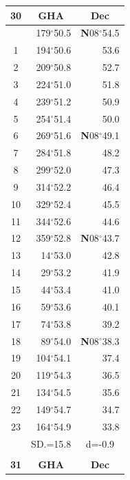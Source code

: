 \documentclass[10pt, a4paper]{report}
\begin{document}
\begin{scriptsize}
\noindent
\begin{tabular*}{0.2\textwidth}[t]{@{\extracolsep{\fill}}|c|rr|}
\hline
\multicolumn{1}{|c|}{\rule{0pt}{2.6ex}\textbf{30}} & \multicolumn{1}{c}{\textbf{GHA}} & \multicolumn{1}{c|}{\textbf{Dec}}\\
\hline\rule{0pt}{2.6ex}\noindent
0 & 179$^\circ$50.5 & \textbf{N}08$^\circ$54.5\\
1 & 194$^\circ$50.6 & 53.6\\
2 & 209$^\circ$50.8 & 52.7\\
3 & 224$^\circ$51.0 & \raisebox{0.24ex}{\boldmath$\cdot$~\boldmath$\cdot$~~}51.8\\
4 & 239$^\circ$51.2 & 50.9\\
5 & 254$^\circ$51.4 & 50.0\\[2Pt]
6 & 269$^\circ$51.6 & \textbf{N}08$^\circ$49.1\\
7 & 284$^\circ$51.8 & 48.2\\
8 & 299$^\circ$52.0 & 47.3\\
9 & 314$^\circ$52.2 & \raisebox{0.24ex}{\boldmath$\cdot$~\boldmath$\cdot$~~}46.4\\
10 & 329$^\circ$52.4 & 45.5\\
11 & 344$^\circ$52.6 & 44.6\\[2Pt]
12 & 359$^\circ$52.8 & \textbf{N}08$^\circ$43.7\\
13 & 14$^\circ$53.0 & 42.8\\
14 & 29$^\circ$53.2 & 41.9\\
15 & 44$^\circ$53.4 & \raisebox{0.24ex}{\boldmath$\cdot$~\boldmath$\cdot$~~}41.0\\
16 & 59$^\circ$53.6 & 40.1\\
17 & 74$^\circ$53.8 & 39.2\\[2Pt]
18 & 89$^\circ$54.0 & \textbf{N}08$^\circ$38.3\\
19 & 104$^\circ$54.1 & 37.4\\
20 & 119$^\circ$54.3 & 36.5\\
21 & 134$^\circ$54.5 & \raisebox{0.24ex}{\boldmath$\cdot$~\boldmath$\cdot$~~}35.6\\
22 & 149$^\circ$54.7 & 34.7\\
23 & 164$^\circ$54.9 & 33.8\\
\hline
\rule{0pt}{2.4ex} & \multicolumn{1}{c}{SD.=15.8} & \multicolumn{1}{c|}{d=-0.9}\\
\hline
\multicolumn{1}{c}{}\\[-0.5ex]\hline
\multicolumn{1}{|c|}{\rule{0pt}{2.6ex}\textbf{31}} & \multicolumn{1}{c}{\textbf{GHA}} & \multicolumn{1}{c|}{\textbf{Dec}}\\

\end{tabular*}
\end{scriptsize}
\end{document}
